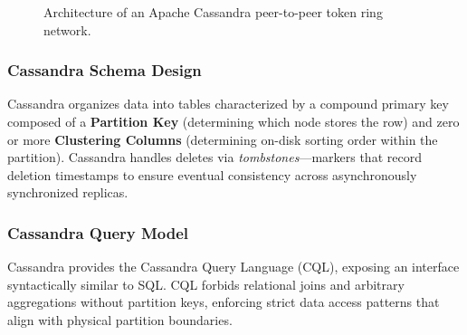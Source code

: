 \documentclass[11pt,a4paper]{article}
\begin{document}
\begin{figure}[htbp]
\centering
{}
\caption{Architecture of an Apache Cassandra peer-to-peer token ring network.}
\label{fig:cassandra_arch}
\end{figure}

\subsubsection{Cassandra Schema Design}
Cassandra organizes data into tables characterized by a compound primary key composed of a \textbf{Partition Key} (determining which node stores the row) and zero or more \textbf{Clustering Columns} (determining on-disk sorting order within the partition). Cassandra handles deletes via \textit{tombstones}---markers that record deletion timestamps to ensure eventual consistency across asynchronously synchronized replicas.

\subsubsection{Cassandra Query Model}
Cassandra provides the Cassandra Query Language (CQL), exposing an interface syntactically similar to SQL. CQL forbids relational joins and arbitrary aggregations without partition keys, enforcing strict data access patterns that align with physical partition boundaries.
\end{document}
